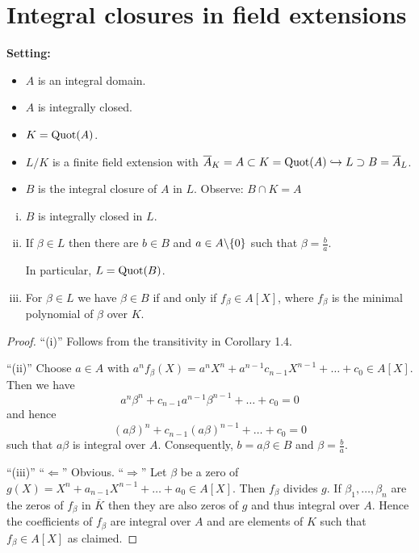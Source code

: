 \section{Integral closures in field extensions}

\textbf{Setting:}
\begin{itemize}
\item $A$ is an integral domain.
\item $A$ is integrally closed.
\item $K= \operatorname{Quot}(A)$.
\item $L / K$ is a finite field extension with $\overline{A}_K = A \subset K = \operatorname{Quot}(A) \hookrightarrow L \supset B = \overline{A}_L$.
\item $B$ is the integral closure of $A$ in $L$. Observe: $B \cap K = A$
\end{itemize}

\begin{remark}
\begin{enumerate}[(i)]
	\item $B$ is integrally closed in $L$.
	\item If $\beta \in L$ then there are $b \in B$ and $a \in A\backslash \{0\}$ such that $\beta = \frac{b}{a}$. 
	
	In particular, $L=\operatorname{Quot}(B)$.
	\item For $\beta\in L$ we have $\beta \in B$ if and only if $f_\beta \in A[X]$, where $f_\beta$ is the minimal polynomial of $\beta$ over $K$.
\end{enumerate}
\end{remark}

\begin{proof}\enquote{(i)} Follows from the transitivity in Corollary 1.4.
	
	\bigskip \enquote{(ii)} Choose $a\in A$ with $a^n f_\beta(X) = a^n X^n+a^{n-1}c_{n-1}X^{n-1} + \dots + c_0 \in A[X]$.
	Then we have
	\[ a^n \beta^n+c_{n-1}a^{n-1}\beta^{n-1} + \dots + c_0=0
	\]
	and hence
	\[ (a \beta)^n+c_{n-1}(a\beta)^{n-1} + \dots + c_0=0
	\]
	such that $a\beta$ is integral over $A$. Consequently, $b=a \beta \in B$ and $\beta = \frac{b}{a}$.
	
	\bigskip \enquote{(iii)} \enquote{$\Leftarrow$} Obvious. \enquote{$\Rightarrow$} Let $\beta$ be a zero of 
	$g(X)=X^n+a_{n-1}X^{n-1}+\dots + a_0 \in A[X]$. Then $f_\beta$ divides $g$.
	If $\beta_1,\dots, \beta_n$ are the zeros of $f_\beta$ in $\overline{K}$ then they are also zeros of $g$ and thus integral over $A$. Hence the coefficients of $f_\beta$ are integral over $A$ and are elements of $K$ such that $f_\beta \in A[X]$ as claimed.
\end{proof}